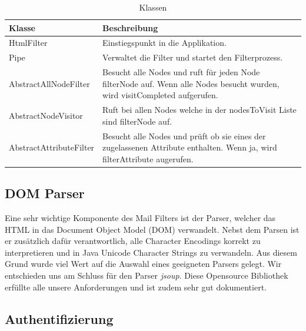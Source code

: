 \begin{table}[H]
\begin{center}
\begin{tabular}{l p{10.5cm} }
\hline
\textbf{Klasse} & \textbf{Beschreibung} \\ \hline \hline
HtmlFilter & Einstiegspunkt in die Applikation. \\
Pipe & Verwaltet die Filter und startet den Filterprozess. \\
AbstractAllNodeFilter & Besucht alle Nodes und ruft für jeden Node filterNode auf. Wenn alle Nodes besucht wurden, wird visitCompleted aufgerufen. \\
AbstractNodeVisitor & Ruft bei allen Nodes welche in der nodesToVisit Liste sind filterNode auf. \\
AbstractAttributeFilter & Besucht alle Nodes und prüft ob sie eines der zugelassenen Attribute enthalten. Wenn ja, wird filterAttribute augerufen. \\
\hline \hline
\end{tabular}
\caption{Klassen}
\label{tab:class}
\end{center}
\end{table}

\newpage

\subsection{DOM Parser}

Eine sehr wichtige Komponente des Mail Filters ist der Parser, welcher das HTML in das Document
Object Model (DOM) verwandelt. Nebst dem Parsen ist er zusätzlich dafür verantwortlich, alle Character
Encodings korrekt zu interpretieren und in Java Unicode Character Strings zu verwandeln. Aus diesem 
Grund wurde viel Wert auf die Auswahl eines geeigneten Parsers gelegt. Wir entschieden uns am Schluss 
für den Parser \textit{jsoup}\cite{DOM:JSOUP}. Diese Opensource Bibliothek erfüllte alle unsere 
Anforderungen und ist zudem sehr gut dokumentiert. 

\subsection{Authentifizierung}

